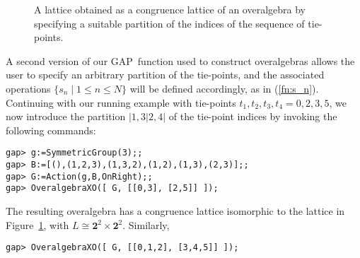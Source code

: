 \documentclass{au}
\numberwithin{equation}{section}
\theoremstyle{plain}
\theoremstyle{definition}
\newcommand{\<}{\ensuremath{\langle}}
\renewcommand{\>}{\ensuremath{\rangle}}
\renewcommand{\leq}{\ensuremath{\leqslant}}
\newcommand{\two}{\ensuremath{\mathbf{2}}}
\newcommand{\GAP}{{\small GAP}} %
\newcommand{\dotsize}{1.0pt}%
\begin{document}
\begin{figure}[h!]
  \centering
  \caption{A lattice obtained as a congruence lattice of an overalgebra by
    specifying a suitable partition of the indices of the sequence of tie-points.}
  \label{fig:ConOverAlgebras3}
\end{figure}

A second version of our \GAP\ function used to construct
overalgebras allows the user to specify an arbitrary partition of the
tie-points, and the associated operations $\{s_n \mid 1\leq n \leq N\}$ will be
defined accordingly, as  in (\ref{fn:s_n}).  Continuing with our running example with
tie-points $t_1, t_2, t_3, t_4 = 0,2,3,5$, we now introduce the partition $|1, 3|2,
4|$ of the tie-point indices by invoking the following commands:

\begin{small}%
\begin{verbatim}
gap> g:=SymmetricGroup(3);;
gap> B:=[(),(1,2,3),(1,3,2),(1,2),(1,3),(2,3)];;
gap> G:=Action(g,B,OnRight);;
gap> OveralgebraXO([ G, [[0,3], [2,5]] ]);
\end{verbatim}
\end{small}

\noindent %
The resulting overalgebra has a congruence lattice isomorphic to the lattice in
Figure~\ref{fig:ConOverAlgebras3}, with
$L \cong \two^2\times\two^2$.  Similarly,

\begin{small}%
\begin{verbatim}
gap> OveralgebraXO([ G, [[0,1,2], [3,4,5]] ]);
\end{verbatim}
\end{small}
\end{document}
